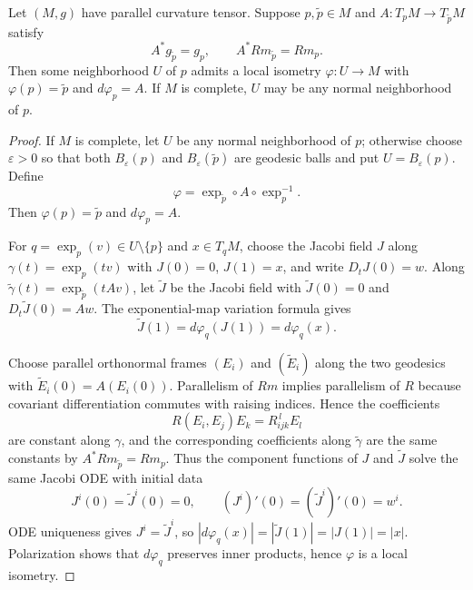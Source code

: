 \begin{lemma}
\label{lem:locally-symmetric-cartan}

Let $(M,g)$ have parallel curvature tensor. Suppose $p,\widetilde p\in M$ and
$A:T_pM\to T_{\widetilde p}M$ satisfy
\[
A^*g_{\widetilde p}=g_p,
\qquad
A^*Rm_{\widetilde p}=Rm_p.
\]
Then some neighborhood $U$ of $p$ admits a local isometry
$\varphi:U\to M$ with
$\varphi(p)=\widetilde p$ and $d\varphi_p=A$. If $M$ is complete, $U$ may be
any normal neighborhood of $p$.
\end{lemma}

\begin{proof}
\sketch If $M$ is complete, let $U$ be any normal neighborhood of $p$;
otherwise choose $\varepsilon>0$ so that both
$B_\varepsilon(p)$ and $B_\varepsilon(\widetilde p)$ are geodesic balls and
put $U=B_\varepsilon(p)$. Define
\[
\varphi=\exp_{\widetilde p}\circ A\circ\exp_p^{-1}.
\]
Then $\varphi(p)=\widetilde p$ and $d\varphi_p=A$.

For $q=\exp_p(v)\in U\setminus\{p\}$ and $x\in T_qM$, choose the Jacobi field
$J$ along $\gamma(t)=\exp_p(tv)$ with $J(0)=0$, $J(1)=x$, and write
$D_tJ(0)=w$. Along
$\widetilde\gamma(t)=\exp_{\widetilde p}(tA v)$, let
$\widetilde J$ be the Jacobi field with
$\widetilde J(0)=0$ and $D_t\widetilde J(0)=Aw$. The exponential-map
variation formula gives
\[
\widetilde J(1)=d\varphi_q(J(1))=d\varphi_q(x).
\]

Choose parallel orthonormal frames $(E_i)$ and $(\widetilde E_i)$ along the
two geodesics with $\widetilde E_i(0)=A(E_i(0))$. Parallelism of $Rm$ implies
parallelism of $R$ because covariant differentiation commutes with raising
indices. Hence the
coefficients
\[
R(E_i,E_j)E_k=R_{ijk}^{\,l}E_l
\]
are constant along $\gamma$, and the corresponding coefficients along
$\widetilde\gamma$ are the same constants by $A^*Rm_{\widetilde p}=Rm_p$.
Thus the component functions of $J$ and $\widetilde J$ solve the same Jacobi
ODE with initial data
\[
J^i(0)=\widetilde J^i(0)=0,
\qquad
(J^i)'(0)=(\widetilde J^i)'(0)=w^i.
\]
ODE uniqueness gives $J^i=\widetilde J^i$, so
$|d\varphi_q(x)|=|\widetilde J(1)|=|J(1)|=|x|$. Polarization shows that
$d\varphi_q$ preserves inner products, hence $\varphi$ is a local isometry.
\end{proof}

